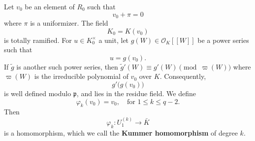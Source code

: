 Let $v_0$ be an element of $R_0$ such that
$$v_0 + \pi = 0$$
where $\pi$ is a uniformizer. The field
$$K_0 = K(v_0)$$
is totally ramified. For $u \in K_0^\times$ a unit, let $g(W) \in \mathcal{O}_K[[W]]$ be a power series such that
$$u = g(v_0).$$
If $\tilde{g}$ is another such power series, then $\tilde{g}'(W) \equiv g'(W) \pmod{\varpi(W)}$ where $\varpi(W)$ is the irreducible polynomial of $v_0$ over $K$. Consequently,
$$g'\bigl(g(v_0)\bigr)$$
is well defined modulo $\mathfrak{p}$, and lies in the residue field. We define
$$\varphi_k(v_0) = v_0, \quad \text{for } 1 \leq k \leq q - 2.$$
Then
$$\varphi_k: U_1^{(k)} \to \bar{K}$$
is a homomorphism, which we call the \textbf{Kummer homomorphism} of degree $k$.
